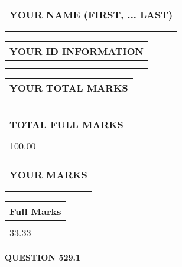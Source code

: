 \documentclass{ctexart}
\begin{document}
   
   
   
\newpage 
\setcounter{page}{ 
   529001 } 
   
   
   
   
\noindent\begin{tabular}{|l|}
\hline
YOUR NAME (FIRST, ... LAST)  \\
\hline
 \\ 
 \\ 
\hline
\end{tabular}
\hspace{0.05in} \begin{tabular}{|l|}
\hline
 YOUR   ID   INFORMATION  \\
\hline
 \\ 
 \\ 
\hline
\end{tabular}
   
   
\vspace{0.2in}\noindent\begin{tabular}{|l|}
\hline
YOUR TOTAL MARKS  \\
\hline
 \\ 
 \\ 
\hline
\end{tabular}
\hspace{0.05in} \begin{tabular}{|l|}
\hline
TOTAL FULL MARKS  \\
\hline
 \\ 
100.00 \\
\hline
\end{tabular}
   
   
 \vspace{0.2in}
 
 
 
 
   
   
  
\vspace{0.2in}
  
\noindent\begin{tabular}{|l|}
\hline
 YOUR MARKS  \\
\hline
 \\ 
 \\ 
\hline
\end{tabular}
\hspace{0.05in} \begin{tabular}{|l|}
\hline
 Full Marks  \\
\hline
 \\ 
33.33 \\
\hline
\end{tabular}
{\textbf{\Large{QUESTION
529.1 
}}}
  
\end{document}

